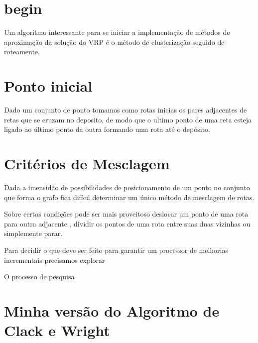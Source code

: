 \section{begin}

 Um algoritmo interessante para se iniciar a implementação de métodos de aproximação da solução do
VRP é o método de clusterização seguido de roteamente.

\section{Ponto inicial}

 Dado um conjunto de ponto tomamos como rotas inicias os pares adjacentes de retas que se cruzam no
deposito, de modo que o ultimo ponto de uma reta esteja ligado ao último ponto da outra formando uma
rota até o depósito. 

\section{Critérios de Mesclagem}

 Dada a imensidão de possibilidades de posicionamento de um ponto no conjunto que forma o grafo fica
difícil determinar um único método de mesclagem de rotas.

 Sobre certas condições pode ser mais proveitoso deslocar um ponto de uma rota para outra adjacente
, dividir os pontos de uma rota entre suas duas vizinhas ou simplemente parar.

 Para decidir o que deve ser feito para garantir um processor de melhorias incrementais precisamos
explorar 

 O processo de pesquisa 



\section{Minha versão do Algoritmo de Clack e Wright}

